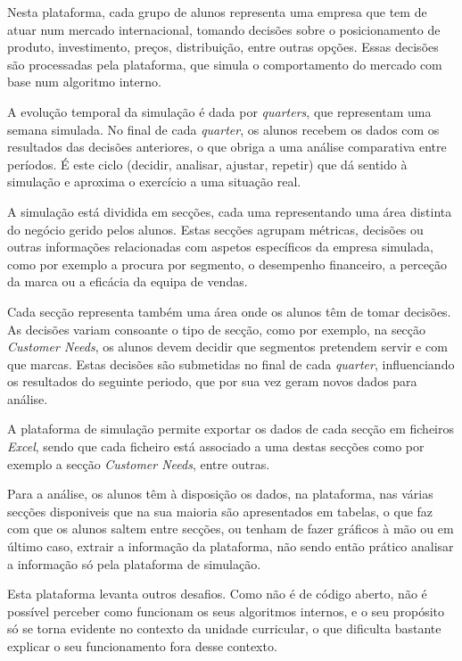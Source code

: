Nesta plataforma, cada grupo de alunos representa uma empresa que tem de atuar num mercado internacional, tomando decisões sobre o posicionamento de produto, investimento, preços, distribuição, entre outras opções. Essas decisões são processadas pela plataforma, que simula o comportamento do mercado com base num algoritmo interno. 

A evolução temporal da simulação é dada por \textit{quarters}, que representam uma semana simulada. No final de cada \textit{quarter}, os alunos recebem os dados com os resultados das decisões anteriores, o que obriga a uma análise comparativa entre períodos. É este ciclo (decidir, analisar, ajustar, repetir) que dá sentido à simulação e aproxima o exercício a uma situação real.

A simulação está dividida em secções, cada uma representando uma área distinta do negócio gerido pelos alunos. Estas secções agrupam métricas, decisões ou outras informações relacionadas com aspetos específicos da empresa simulada, como por exemplo a procura por segmento, o desempenho financeiro, a perceção da marca ou a eficácia da equipa de vendas.

Cada secção representa também uma área onde os alunos têm de tomar decisões. As decisões variam consoante o tipo de secção, como por exemplo, na secção \textit{Customer Needs}, os alunos devem decidir que segmentos pretendem servir e com que marcas. Estas decisões são submetidas no final de cada \textit{quarter}, influenciando os resultados do seguinte periodo, que por sua vez geram novos dados para análise.

A plataforma de simulação permite exportar os dados de cada secção em ficheiros \textit{Excel}, sendo que cada ficheiro está associado a uma destas secções como por exemplo a secção \textit{Customer Needs}, entre outras.

Para a análise, os alunos têm à disposição os dados, na plataforma, nas várias secções disponiveis que na sua maioria são apresentados em tabelas, o que faz com que os alunos saltem entre secções, ou tenham de fazer gráficos à mão ou em último caso, extrair a informação da plataforma, não sendo então prático analisar a informação só pela plataforma de simulação.

Esta plataforma levanta outros desafios. Como não é de código aberto, não é possível perceber como funcionam os seus algoritmos internos, e o seu propósito só se torna evidente no contexto da unidade curricular, o que dificulta bastante explicar o seu funcionamento fora desse contexto.

